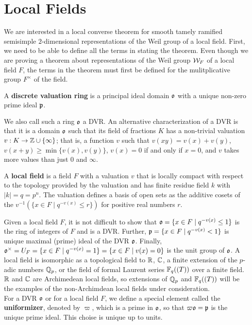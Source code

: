 \section{Local Fields}
\label{sec:local-fields}
We are interested in a local converse theorem for smooth tamely ramified semisimple $2$-dimensional representations of the Weil group of a local field.
First, we need to be able to define all the terms in stating the theorem.
Even though we are proving a theorem about representations of the Weil group $\mathcal{W}_F$ of a local field $F$, the terms in the theorem must first be defined for the mulitplicative group $F^\times$ of the field.
\begin{defn}
  A \textbf{discrete valuation ring} is a principal ideal domain $\mathfrak{o}$ with a unique non-zero prime ideal $\mathfrak{p}$.
\end{defn}
We also call such a ring $\mathfrak{o}$ a DVR.
An alternative characterization of a DVR is that it is a domain $\mathfrak{o}$ such that its field of fractions $K$ has a non-trivial valuation $v : K \to \mathbb{Z} \cup \{ \infty \}$; that is, a function $v$ such that $v(xy) = v(x) + v(y)$, $v(x+y) \geq \min \{v(x),v(y)\}$, $v(x) = 0$ if and only if $x = 0$, and $v$ takes more values than just $0$ and $\infty$.
\begin{defn}
  A \textbf{local field} is a field $F$ with a valuation $v$ that is locally compact with respect to the topology provided by the valuation and has finite residue field $k$ with $|k| = q = p^n$.
  The valuation defines a basis of open sets as the additive cosets of the $v^{-1}(\{x \in F \mid q^{-v(x)} \leq r\})$ for positive real numbers $r$.
\end{defn}
Given a local field $F$, it is not difficult to show that $\mathfrak{o} = \{x \in F \mid q^{-v(x)} \leq 1\}$ is the ring of integers of $F$ and is a DVR.
Further, $\mathfrak{p} = \{x \in F \mid q^{-v(x)} < 1\}$ is unique maximal (prime) ideal of the DVR $\mathfrak{o}$.
Finally, $\mathfrak{o}^\times = U_F = \{x \in F \mid q^{-v(x)} = 1\} = \{x \in F \mid v(x) = 0\}$ is the unit group of $\mathfrak{o}$.
A local field is isomorphic as a topological field to $\mathbb{R}$, $\mathbb{C}$, a finite extension of the $p$-adic numbers $\mathbb{Q}_p$, or the field of formal Laurent series $\mathbb{F}_q((T))$ over a finite field.
$\mathbb{R}$ and $\mathbb{C}$ are Archimedean local fields, so extensions of $\mathbb{Q}_p$ and $\mathbb{F}_q((T))$ will be the examples of the non-Archimdean local fields under consideration.
\\

For a DVR $\mathfrak{o}$ or for a local field $F$, we define a special element called the \textbf{uniformizer}, denoted by $\varpi$, which is a prime in $\mathfrak{o}$, so that $\varpi \mathfrak{o} = \mathfrak{p}$ is the unique prime ideal.
This choise is unique up to units.

